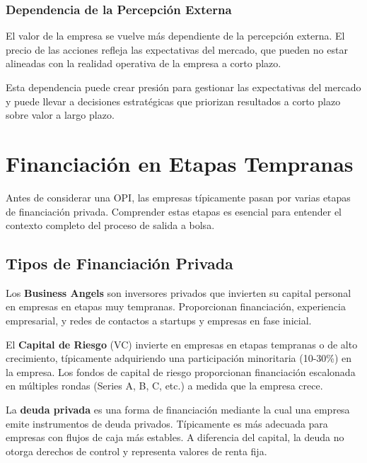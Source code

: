 \subsubsection{Dependencia de la Percepción Externa}

\begin{proposicion}
El valor de la empresa se vuelve más dependiente de la percepción externa. El precio de las acciones refleja las expectativas del mercado, que pueden no estar alineadas con la realidad operativa de la empresa a corto plazo.
\end{proposicion}

Esta dependencia puede crear presión para gestionar las expectativas del mercado y puede llevar a decisiones estratégicas que priorizan resultados a corto plazo sobre valor a largo plazo.

\section{Financiación en Etapas Tempranas}

Antes de considerar una OPI, las empresas típicamente pasan por varias etapas de financiación privada. Comprender estas etapas es esencial para entender el contexto completo del proceso de salida a bolsa.

\subsection{Tipos de Financiación Privada}

\begin{definicion}
Los \textbf{Business Angels} son inversores privados que invierten su capital personal en empresas en etapas muy tempranas. Proporcionan financiación, experiencia empresarial, y redes de contactos a startups y empresas en fase inicial.
\end{definicion}

\begin{definicion}
El \textbf{Capital de Riesgo} (VC) invierte en empresas en etapas tempranas o de alto crecimiento, típicamente adquiriendo una participación minoritaria (10-30\%) en la empresa. Los fondos de capital de riesgo proporcionan financiación escalonada en múltiples rondas (Series A, B, C, etc.) a medida que la empresa crece.
\end{definicion}

\begin{definicion}
La \textbf{deuda privada} es una forma de financiación mediante la cual una empresa emite instrumentos de deuda privados. Típicamente es más adecuada para empresas con flujos de caja más estables. A diferencia del capital, la deuda no otorga derechos de control y representa valores de renta fija.
\end{definicion}

